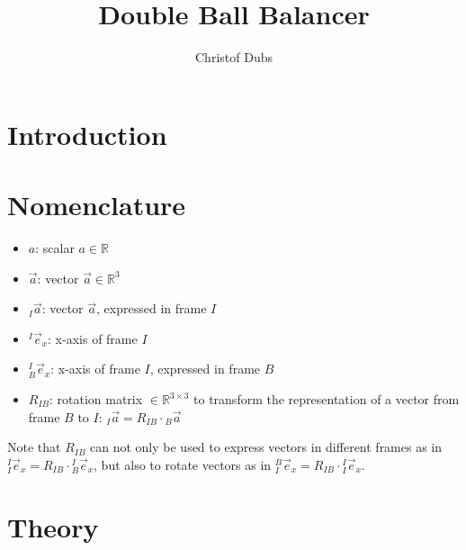 \documentclass{article}
\begin{document}
\title{Double Ball Balancer}
\author{Christof Dubs}

\maketitle

\section{Introduction}

\section{Nomenclature}

\begin{itemize}
	\item{$a$: scalar $a \in \mathbb{R}$}
	\item{$\vec{a}$: vector $\vec{a} \in \mathbb{R}^3$}
	\item{${}_I \vec{a}$: vector $\vec{a}$, expressed in frame $I$}
	\item{${}^I \vec{e}_x$: x-axis of frame $I$}
	\item{${}_B^I \vec{e}_x$: x-axis of frame $I$, expressed in frame $B$}
	\item{$R_{IB}$: rotation matrix $\in \mathbb{R}^{3 \times 3}$ to transform the representation of a vector from frame $B$ to $I$: ${}_I \vec{a} =R_{IB} \cdot  {}_B \vec{a}$}
\end{itemize}
Note that $R_{IB}$ can not only be used to express vectors in different frames as in ${}_I^I \vec{e}_x =R_{IB} \cdot  {}_B^I \vec{e}_x$, but also to rotate vectors as in ${}_I^B \vec{e}_x =R_{IB} \cdot  {}_I^I \vec{e}_x$.

\section{Theory}


\end{document}
